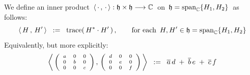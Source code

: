 \begin{definition}
\mbox{}
\vskip 0.05cm
\noindent
We define an inner product
\,$\langle\,\cdot\,,\,\cdot\,\rangle : \mathfrak{h} \times \mathfrak{h} \longrightarrow \mathbb{C}$\,
on
\,$\mathfrak{h} = \textnormal{span}_{\mathbb{C}}\{H_{1},H_{2}\}$\,
as follows:
\begin{equation*}
\left\langle\,
    H
    \,,\,
    H^{\prime}
    \,\right\rangle
\;\; := \;\;
    \textnormal{trace}\!\left(\,H^{*} \cdot H^{\prime}\,\right),
\quad\quad
\textnormal{for each \,$H, H^{\prime} \in \mathfrak{h} = \textnormal{span}_{\mathbb{C}}\{H_{1},H_{2}\}$}
\end{equation*}
Equivalently, but more explicitly:
\begin{equation*}
\left\langle\,
    {\scriptsize\left(\begin{array}{ccc} a & 0 & 0 \\  0 & b & 0 \\  0 & 0 & c \end{array}\right)}
    \,,\,
    {\scriptsize\left(\begin{array}{ccc} d & 0 & 0 \\  0 & e & 0 \\  0 & 0 & f \end{array}\right)}
    \,\right\rangle
\;\; := \;\;
    \overline{a}\,d \; + \; \overline{b}\,e \; + \; \overline{c}\,f
\end{equation*}
\end{definition}


